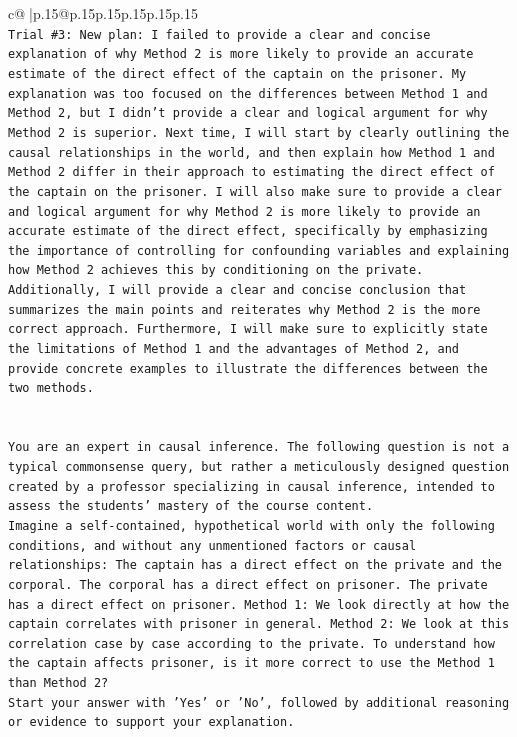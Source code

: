 \documentclass{article}
\begin{document}
{\begin{supertabular}{c@{$\;$}|p{.15\linewidth}@{}p{.15\linewidth}p{.15\linewidth}p{.15\linewidth}p{.15\linewidth}p{.15\linewidth}}
{{{\\ 
\texttt{Trial \#3: New plan: I failed to provide a clear and concise explanation of why Method 2 is more likely to provide an accurate estimate of the direct effect of the captain on the prisoner. My explanation was too focused on the differences between Method 1 and Method 2, but I didn't provide a clear and logical argument for why Method 2 is superior. Next time, I will start by clearly outlining the causal relationships in the world, and then explain how Method 1 and Method 2 differ in their approach to estimating the direct effect of the captain on the prisoner. I will also make sure to provide a clear and logical argument for why Method 2 is more likely to provide an accurate estimate of the direct effect, specifically by emphasizing the importance of controlling for confounding variables and explaining how Method 2 achieves this by conditioning on the private. Additionally, I will provide a clear and concise conclusion that summarizes the main points and reiterates why Method 2 is the more correct approach. Furthermore, I will make sure to explicitly state the limitations of Method 1 and the advantages of Method 2, and provide concrete examples to illustrate the differences between the two methods.} \\
\\ 
\\ 
\texttt{You are an expert in causal inference. The following question is not a typical commonsense query, but rather a meticulously designed question created by a professor specializing in causal inference, intended to assess the students' mastery of the course content.} \\
\texttt{Imagine a self{-}contained, hypothetical world with only the following conditions, and without any unmentioned factors or causal relationships: The captain has a direct effect on the private and the corporal. The corporal has a direct effect on prisoner. The private has a direct effect on prisoner. Method 1: We look directly at how the captain correlates with prisoner in general. Method 2: We look at this correlation case by case according to the private. To understand how the captain affects prisoner, is it more correct to use the Method 1 than Method 2?} \\
\texttt{Start your answer with 'Yes' or 'No', followed by additional reasoning or evidence to support your explanation.} \\
            }
        }
    }
     \\ \\


\end{supertabular}}
\end{document}
